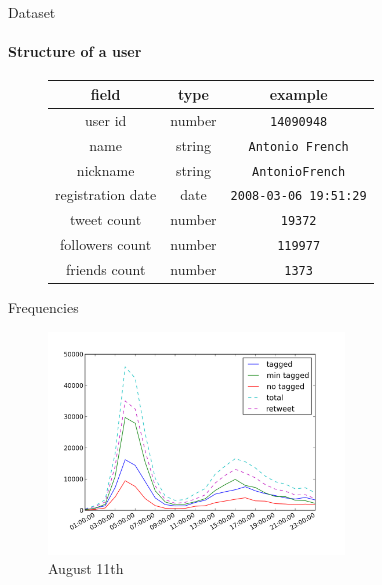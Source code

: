 \documentclass[first=dblue,second=red,logo=blueexc]{aaltoslides}
\begin{document}

\begin{frame}{Dataset}
\framesubtitle{Structure of a user}

\begin{figure}[h!]
\centering
\begin{tabular}{ccc}
field & type & example\\
\hline
\hline
user id & number & \texttt{14090948} \\ \hline
name & string & \texttt{Antonio French} \\ \hline
nickname & string & \texttt{AntonioFrench} \\ \hline
registration date & date & \texttt{2008-03-06 19:51:29} \\ \hline
tweet count & number & \texttt{19372} \\ \hline
followers count & number & \texttt{119977} \\ \hline
friends count & number & \texttt{1373} \\ \hline \hline
\end{tabular}
\end{figure}


\end{frame}


\begin{frame}{Frequencies}

\begin{figure}[h!]
\begin{center}
	\includegraphics[width=0.7\textwidth]{images/freqs/freq_11_08.png}
	\caption{August 11th}
\end{center}
\end{figure}


\end{frame}
\end{document}
